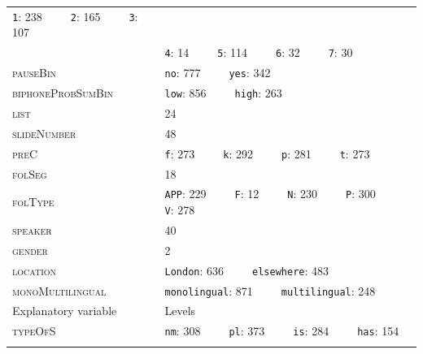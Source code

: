 \begin{table}
\begin{tabular}{ll}
\texttt{1}: 238~ ~ ~ \texttt{2}: 165~ ~ ~ \texttt{3}: 107             \\
                                      & \texttt{4}: 14~ ~ ~ \texttt{5}: 114~ ~ ~ \texttt{6}: 32~ ~ ~ \texttt{7}: 30                  \\
\textsc{pauseBin}                              & \texttt{no}: 777~ ~ ~ \texttt{yes}: 342                                    \\
\textsc{biphoneProbSumBin}                     & \texttt{low}: 856~ ~ ~ \texttt{high}: 263                                  \\
\textsc{list}                                  & 24                                                       \\
\textsc{slideNumber}                           & 48                                                       \\
\textsc{preC}                                  & \texttt{f}: 273~ ~ ~ \texttt{k}: 292~ ~ ~ \texttt{p}: 281~ ~ ~ \texttt{t}: 273               \\
\textsc{folSeg}                                & 18                                                       \\
\textsc{folType}                               & \texttt{APP}: 229~ ~ ~ \texttt{F}: 12~ ~ ~ \texttt{N}: 230~ ~ ~ \texttt{P}: 300~ ~ ~ \texttt{V}: 278  \\
\textsc{speaker}                               & 40                                                       \\
\textsc{gender}                                & 2                                                        \\
\textsc{location}                              & \texttt{London}: 636~ ~ ~ \texttt{elsewhere}: 483                          \\
\textsc{monoMultilingual}                      & \texttt{monolingual}: 871~ ~ ~ \texttt{multilingual}: 248                  \\
\midrule
Explanatory variable                  & Levels                                                   \\
\midrule
\textsc{typeOfS}                               & \texttt{nm}: 308~ ~ ~ \texttt{pl}: 373~ ~ ~ \texttt{is}: 284~ ~ ~ \texttt{has}: 154   \\      
\lspbottomrule
\end{tabular}
\end{table}



